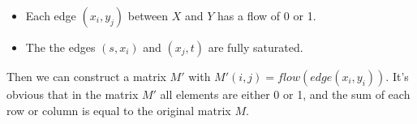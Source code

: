 \begin{itemize}
  \item{Each edge $(x_i, y_j)$ between $X$ and $Y$} has a flow of 0 or 1.
  \item{The the edges $(s, x_i)$ and $(x_j, t)$ are fully saturated}.
\end{itemize}

Then we can construct a matrix $M'$ with $M'(i, j) = flow(edge(x_i, y_i))$. It's obvious that in the matrix $M'$ all elements are either 0 or 1, and the sum of each row or column is equal to the original matrix $M$.